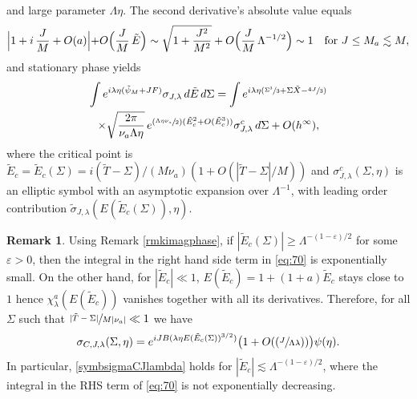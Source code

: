 \documentclass[JEP,XML,SOM,Unicode,NoEqCountersInSection,NoFloatCountersInSection,published]{cedram}
\newcommand{\Psfrac}[2]{(\sfrac{#1}{#2})}
\let\epsilon\varepsilon
\theoremstyle{plain}
\theoremstyle{definition}
\newtheorem{rmq}{Remark}[section]
\begin{document}
and large parameter $\Lambda\eta$. The second derivative's absolute value equals
\[
\Bigl|1+i\,\frac JM+O(a)\Bigl|+O\Bigl(\frac JM\, {\tilde E}\Bigr)\sim \sqrt{1+\frac{J^2}{M^2}}+O\Bigl(\frac JM\, \Lambda^{-1/2}\Bigr)\sim 1\quad\text{for }J\leq M_a\lesssim M,
\]
and stationary phase yields
\begin{multline}
\label{eq:70}
\int e^{i \lambda\eta (\tilde\psi_{M}+JF)}\sigma_{J,\lambda } \,d{\tilde E} \,d\Sigma = \int e^{i \lambda\eta (\sfrac{\Sigma^3}{3}+\Sigma \tilde X-\sfrac{4J}{3})} \\
\times \sqrt{\frac{2\pi}{\nu_a \Lambda\eta}}\, e^{\Psfrac{\Lambda\eta\nu_a}{2}({\tilde E}^{2}_{c}+O({\tilde E}_{c}^{3}))}\sigma^{c}_{J,\lambda}\,d\Sigma+O(h^{\infty}),
\end{multline}
where the critical point is ${\tilde E}_{c}=\tilde E_c(\Sigma)=i(\tilde T-\Sigma)/(M\nu_a) (1+O(|\tilde T-\Sigma|/M))$ and $\sigma^{c}_{J,\lambda}(\Sigma,\eta)$ is an elliptic symbol with an asymptotic expansion over $\Lambda^{-1}$, with leading order contribution $\tilde \sigma_{J,\lambda}(E(\tilde E_{c}(\Sigma)),\eta)$.

\begin{rmq}\label{rmqsymbC}
Using Remark \ref{rmkimagphase}, if $|\tilde E_c(\Sigma)|\geq \Lambda^{-(1-\epsilon)/2}$ for some $\epsilon>0$, then the integral in the right hand side term in \eqref{eq:70} is exponentially small. On the other hand, for $|\tilde E_c|\ll 1$, $E(\tilde E_c)=1+(1+a)\tilde E_c$ stays close to $1$ hence $\chi^a_{\lambda}(E(\tilde E_c))$ vanishes together with all its derivatives. Therefore, for all $\Sigma$ such that $\sfrac{|\tilde T-\Sigma|}{M|\nu_a|}\ll 1$ we have
\begin{equation}\label{symbsigmaCJlambda}
\sigma_{C,J,\lambda}(\Sigma,\eta)=e^{iJB(\lambda\eta E(\tilde E_c(\Sigma))^{3/2})}\bigl(1+O(\Psfrac{J}{\Lambda\lambda})\bigr)\psi(\eta).
\end{equation}
In particular, \eqref{symbsigmaCJlambda} holds for $|\tilde E_c|\lesssim \Lambda^{-(1-\epsilon)/2}$, \ie where the integral in the RHS term of \eqref{eq:70} is not exponentially decreasing.
\end{rmq}
\end{document}
